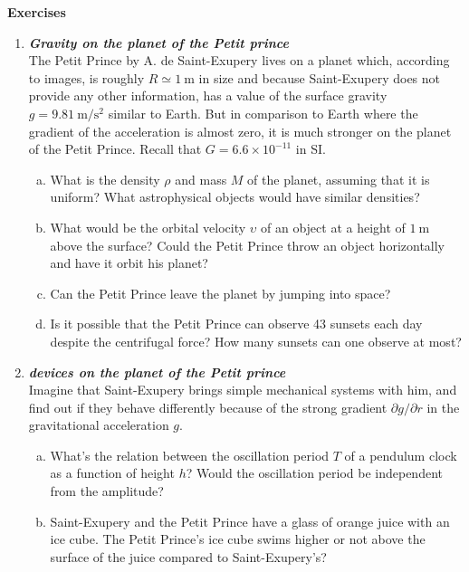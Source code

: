 \documentclass[a4paper,12pt]{article}
\newcommand{\question}[1]{\textbf{\textit{#1}}}
\begin{document}
{\bf Exercises}
\\
\begin{enumerate}

\item \question{Gravity on the planet of the Petit prince}\\
The Petit Prince by A. de Saint-Exupery lives on a planet which,
according to images, is roughly $R\simeq 1~\mathrm{m}$ in size and
because Saint-Exupery does not provide any other information, has a
value of the surface gravity $g=9.81~\mathrm{m}/\mathrm{s}^2$ similar
to Earth. But in comparison to Earth where the gradient of the
acceleration is almost zero, it is much stronger on the planet of the
Petit Prince. Recall that $G=6.6\times 10^{-11}$ in SI.
\begin{enumerate}[(a)]
\item{What is the density $\rho$ and mass $M$ of the planet, assuming that it is uniform? What astrophysical objects would have similar densities?}
\item{What would be the orbital velocity $\upsilon$ of an object at a height of $1~\mathrm{m}$ above the surface? Could the Petit Prince throw an object horizontally and have it orbit his planet?}
\item{Can the Petit Prince leave the planet by jumping into space?}
\item{Is it possible that the Petit Prince can observe 43 sunsets each day despite the centrifugal force? How many sunsets can one observe at most?}
\end{enumerate}

\item \question{devices on the planet of the Petit prince}\\
Imagine that Saint-Exupery brings simple mechanical systems with him, and find out if they behave differently because of the strong gradient $\partial g/\partial r$ in the gravitational acceleration $g$.
\begin{enumerate}[(a)]
\item{What's the relation between the oscillation period $T$ of a pendulum clock as a function of height $h$? Would the oscillation period be independent from the amplitude?}
\item{Saint-Exupery and the Petit Prince have a glass of orange juice
    with an ice cube. The Petit Prince's ice cube swims higher or not above the surface of the juice compared to Saint-Exupery's?}
\end{enumerate}


\end{enumerate}
\end{document}

